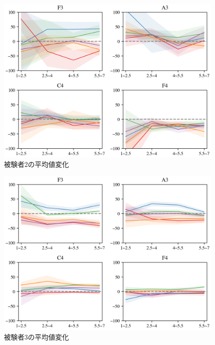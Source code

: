 \documentclass[10ptj,a4j,dvipdfmx,uplatex, oneside, openany]{jsbook}%
\begin{document}
\begin{figure}[htbp]
    \begin{center}
      \includegraphics[clip,width=12.0cm]{long_mean_2.png}
      \caption{被験者2の平均値変化}
      \label{long_mean_2}
    \end{center}
\end{figure}

\begin{figure}[htbp]
    \begin{center}
      \includegraphics[clip,width=12.0cm]{long_mean_3.png}
      \caption{被験者3の平均値変化}
      \label{long_mean_3}
    \end{center}
\end{figure}
\end{document}
